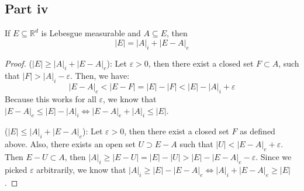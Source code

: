 \subsection{Part iv}

\begin{question}
   If $E \subseteq \mathbb{R}^d$ is Lebesgue measurable and $A \subseteq E$, then
    $$
    |E|=|A|_i+|E-A|_e
    $$
\end{question}

\begin{answer}
    \begin{proof}
        ($\lvert E \rvert \geq \lvert A \rvert_i + \lvert E - A \rvert_e$): Let $\varepsilon > 0$, then there exist a closed set $F \subset A$, such that $\lvert F \rvert > \lvert A \rvert_i - \varepsilon$. Then, we have:
        \begin{equation}
            \lvert E - A \rvert_e < \lvert E - F \rvert = \lvert E \rvert - \lvert F \rvert < \lvert E \rvert - \lvert A \rvert_i + \varepsilon
        \end{equation}
        Because this works for all $\varepsilon$, we know that $\lvert E - A \rvert_e \leq \lvert E \rvert - \lvert A \rvert_i \Leftrightarrow \lvert E - A \rvert_e + \lvert A \rvert_i \leq \lvert E \rvert$.
        
        ($\lvert E \rvert \leq \lvert A \rvert_i + \lvert E - A \rvert_e$): Let $\varepsilon > 0$, then there exist a closed set $F$ as defined above. Also, there exists an open set $U \supset E - A$ such that $\lvert U \rvert < \lvert E - A \rvert_e + \varepsilon$. Then $E-U \subset A$, then $\lvert A \rvert_i \geq \lvert E - U \rvert = \lvert E \rvert - \lvert U \rvert > \lvert E \rvert - \lvert E - A \rvert_e - \varepsilon$. Since we picked $\varepsilon$ arbitrarily, we know that $\lvert A \rvert_i \geq \lvert E \rvert - \lvert E - A \rvert_e \Leftrightarrow \lvert A \rvert_i + \lvert E - A \rvert_e \geq \lvert E \rvert$.
    \end{proof}
\end{answer}